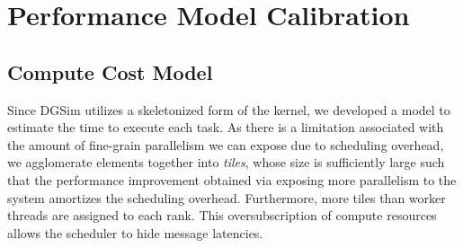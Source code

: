 \section{Performance Model Calibration}
\label{sec:calibration}
\subsection{Compute Cost Model}
\label{sec:compute-cost-model}
Since DGSim utilizes a skeletonized form of the kernel, we developed a model to estimate the time to execute each task.
As there is a limitation associated with the amount of fine-grain parallelism we can expose due to scheduling overhead, we agglomerate elements together into \emph{tiles},
whose size is sufficiently large such that the performance improvement obtained via exposing more parallelism to the system amortizes the scheduling overhead. Furthermore, more tiles than worker threads are assigned to each rank. This oversubscription of compute resources allows the scheduler to hide message latencies.


